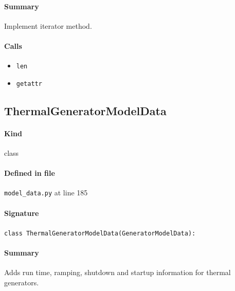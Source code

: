 \documentclass[11pt]{report}
\begin{document}
\paragraph{Summary} Implement iterator method.
\paragraph{Calls}
\begin{itemize}[leftmargin=*]
  \item \texttt{len}
  \item \texttt{getattr}
\end{itemize}
\subsection{ThermalGeneratorModelData}
\label{def:model_data.py:ThermalGeneratorModelData:L185}
\paragraph{Kind} class
\paragraph{Defined in file} \texttt{model\_data.py} at line 185
\paragraph{Signature} \texttt{class ThermalGeneratorModelData(GeneratorModelData):}
\paragraph{Summary} Adds run time, ramping, shutdown and startup information for thermal generators.
\end{document}
